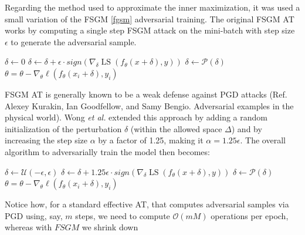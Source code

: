 \documentclass[LaM,binding=0.6cm]{./packages/sapthesis/sapthesis}
\begin{document}
        Regarding the method used to approximate the inner maximization, it was used a small variation of the FSGM \ref{fgsm} adversarial training.
        The original FSGM AT works by computing a single step FSGM attack on the mini-batch with step size $\epsilon$ to generate the adversarial sample.
        \newpage
        \begin{algorithmic}[0]
             
             
            \State $\delta \gets 0$
            \State $\delta \gets \delta + \epsilon \cdot sign(\nabla_{\delta} \operatorname{LS}\left(f_{\theta}(x+\delta), y\right))$  
            \State $\delta \gets \mathcal{P}(\delta) $
            \State $\theta=\theta-\nabla_{\theta} \ell\left(f_{\theta}\left(x_{i}+\delta\right), y_{i}\right)$ 
            \EndFor
            \EndFor
            \EndProcedure
        \end{algorithmic}
        FSGM AT is generally known to be a weak defense against PGD attacks (Ref. Alexey Kurakin, Ian Goodfellow, and Samy Bengio. Adversarial examples in the physical world).
        Wong \textit{et al.} extended this approach by adding a random initialization of the perturbation 
        $\delta$ (within the allowed space $\Delta$) and by increasing the step size $\alpha$ by a factor of 1.25, making it $\alpha = 1.25 \epsilon$.
        The overall algorithm to adversarially train the model then becomes:
        \begin{algorithmic}[h]
             
             
            \State $\delta \gets \mathcal{U}(-\epsilon, \epsilon) $ 
            \State $\delta \gets \delta + 1.25\epsilon \cdot sign(\nabla_{\delta} \operatorname{LS}\left(f_{\theta}(x+\delta), y\right))$  
            \State $\delta \gets \mathcal{P}(\delta) $
            \State $\theta=\theta-\nabla_{\theta} \ell\left(f_{\theta}\left(x_{i}+\delta\right), y_{i}\right)$ 
            \EndFor
            \EndFor
            \EndProcedure
        \end{algorithmic}
        Notice how, for a standard effective AT, that computes adversarial samples via PGD using, say, $m$
        steps, we need to compute $\mathcal{O}\left(mM\right)$ operations per epoch, whereas with $FSGM$ we shrink down 
\end{document}
